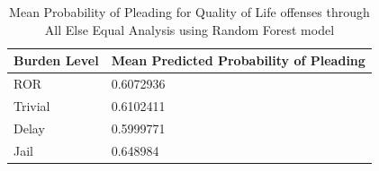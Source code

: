 \begin{table}
\centering
\begin{tabular}{|p{}|p{}|}
  \hline
\textbf{Burden Level} & \textbf{Mean Predicted Probability of Pleading} \\ \hline
    ROR & 0.6072936 \\ \hline
    Trivial & 0.6102411 \\ \hline
    Delay & 0.5999771 \\ \hline
    Jail & 0.648984 \\ \hline
  \end{tabular}
  \caption{Mean Probability of Pleading for Quality of Life offenses through All Else Equal Analysis using Random Forest model}
  \label{table:QoL_plead}
\end{table}



